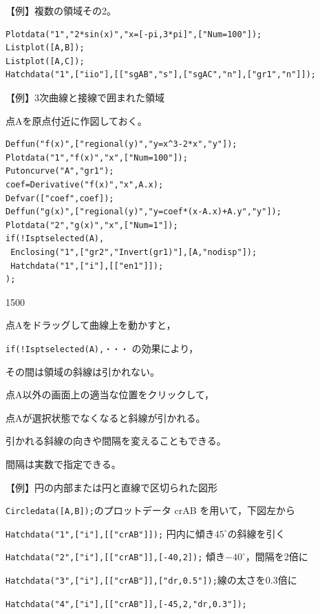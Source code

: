 \documentclass[papersize,a4paper,10pt,uplatex]{jsarticle}
\begin{document}
\begin{description}
【例】複数の領域その2。
\begin{verbatim}
Plotdata("1","2*sin(x)","x=[-pi,3*pi]",["Num=100"]);
Listplot([A,B]);
Listplot([A,C]);
Hatchdata("1",["iio"],[["sgAB","s"],["sgAC","n"],["gr1","n"]]);
\end{verbatim}
\begin{center}
\begin{center}  \end{center}
\end{center}


【例】3次曲線と接線で囲まれた領域

点Aを原点付近に作図しておく。
\begin{verbatim}
Deffun("f(x)",["regional(y)","y=x^3-2*x","y"]);
Plotdata("1","f(x)","x",["Num=100"]);
Putoncurve("A","gr1");
coef=Derivative("f(x)","x",A.x);
Defvar(["coef",coef]);
Deffun("g(x)",["regional(y)","y=coef*(x-A.x)+A.y","y"]);
Plotdata("2","g(x)","x",["Num=1"]);
if(!Isptselected(A),
 Enclosing("1",["gr2","Invert(gr1)"],[A,"nodisp"]);
 Hatchdata("1",["i"],[["en1"]]);
);

\end{verbatim}
\begin{layer}{150}{0}
\end{layer}

点Aをドラッグして曲線上を動かすと，

\verb|if(!Isptselected(A),・・・| の効果により，

その間は領域の斜線は引かれない。

点A以外の画面上の適当な位置をクリックして，

点Aが選択状態でなくなると斜線が引かれる。

引かれる斜線の向きや間隔を変えることもできる。

間隔は実数で指定できる。

\vspace{\baselineskip}
【例】円の内部または円と直線で区切られた図形

\verb|Circledata([A,B]);|のプロットデータ crAB を用いて，下図左から

\verb|Hatchdata("1",["i"],[["crAB"]]);| 円内に傾き$45^{\circ}$の斜線を引く

\verb|Hatchdata("2",["i"],[["crAB"]],[-40,2]);| 傾き$-40^{\circ}$，間隔を2倍に

\verb|Hatchdata("3",["i"],[["crAB"]],["dr,0.5"]);|線の太さを0.3倍に

\verb|Hatchdata("4",["i"],[["crAB"]],[-45,2,"dr,0.3"]);| 


\end{description}
\end{document}
